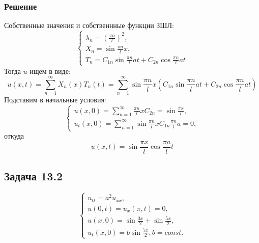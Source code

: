 \documentclass[11pt]{article}
\begin{document}
\subsubsection{Решение}
\label{sec:org9ff848d}
Собственные значения и собственнные функции ЗШЛ:
\begin{equation}
\begin{cases}
\lambda_n = \left(\frac{\pi n}l\right)^2, \\
X_n = \sin\frac{\pi n}lx, \\
T_n = C_{1n}\sin\frac{\pi n}lat + C_{2n}\cos\frac{\pi n}lat
\end{cases}
\end{equation}
Тогда $u$ ищем в виде:
\begin{equation}
u(x, t) = \sum_{n = 1}^{\infty}X_n(x)T_n(t) =
\sum_{n = 1}^{\infty}\sin\frac{\pi n}lx\left(C_{1n}\sin\frac{\pi n}lat + C_{2n}\cos\frac{\pi n}lat\right)
\end{equation}
Подставим в начальные условия:
\begin{equation}
\begin{cases}
u(x, 0) = \sum_{n = 1}^{\infty}\frac{\pi n}lxC_{2n} = \sin\frac{\pi x}l, \\
u_t(x, 0) = \sum_{n = 1}^{\infty}\sin\frac{\pi n}lxC_{1n}\frac{\pi n}la = 0,
\end{cases}
\end{equation}
откуда
\begin{equation}
u(x, t) = \sin\frac{\pi x}l\cos\frac{\pi a}lt
\end{equation}
\subsection{Задача 13.2}
\label{sec:org126e556}
\begin{equation}
\begin{cases}
u_{tt} = a^2u_{xx}, \\
u(0, t) = u_x(\pi, t) = 0, \\
u(x, 0) = \sin\frac{3x}2 + \sin\frac{5x}2, \\
u_t(x, 0) = b\sin\frac{7x}2, b = const.
\end{cases}
\end{equation}
\end{document}
